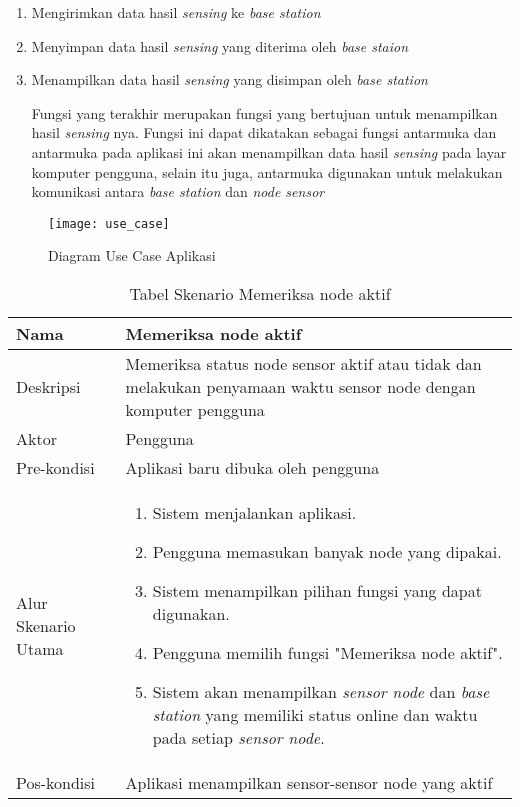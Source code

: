 \begin{enumerate}
	\item Mengirimkan data hasil \textit{sensing} ke \textit{base station}
	
	
	\item Menyimpan data hasil \textit{sensing} yang diterima oleh \textit{base staion}
	
	
	\item Menampilkan data hasil \textit{sensing} yang disimpan oleh \textit{base station}
	
	Fungsi yang terakhir merupakan fungsi yang bertujuan untuk menampilkan hasil \textit{sensing} nya. Fungsi ini dapat dikatakan sebagai fungsi antarmuka dan antarmuka pada aplikasi ini akan menampilkan data hasil \textit{sensing} pada layar komputer pengguna, selain itu juga, antarmuka digunakan untuk melakukan komunikasi antara \textit{base station} dan \textit{node sensor}
\end{enumerate}

\begin{figure}[H] 
		\centering  
		\texttt{[image: use\_case]}  
		\caption[Diagram Use Case Aplikasi]{Diagram Use Case Aplikasi}
		\label{fig:use_case} 
\end{figure}


\begin{table}[H]
	\centering
	\caption{Tabel Skenario Memeriksa node aktif}
		\begin{tabular}{|p{}|p{}|}
    	\hline
        Nama & Memeriksa node aktif \\ 
        \hline
        Deskripsi & Memeriksa status node sensor aktif atau tidak dan melakukan penyamaan waktu sensor node dengan komputer pengguna\\ 
        \hline
        Aktor & Pengguna\\
		\hline
		Pre-kondisi & Aplikasi baru dibuka oleh pengguna\\
		\hline
        Alur Skenario Utama & \begin{enumerate}
				\item Sistem menjalankan aplikasi.
				\item Pengguna memasukan banyak node yang dipakai.
				\item Sistem menampilkan pilihan fungsi yang dapat digunakan.
				\item Pengguna memilih fungsi "Memeriksa node aktif".
				\item Sistem akan menampilkan \textit{sensor node} dan \textit{base station} yang memiliki status online dan waktu pada setiap \textit{sensor node}.
			\end{enumerate}\\
		\hline
		Pos-kondisi & Aplikasi menampilkan sensor-sensor node yang aktif\\
		\hline
    \end{tabular}
\end{table}



